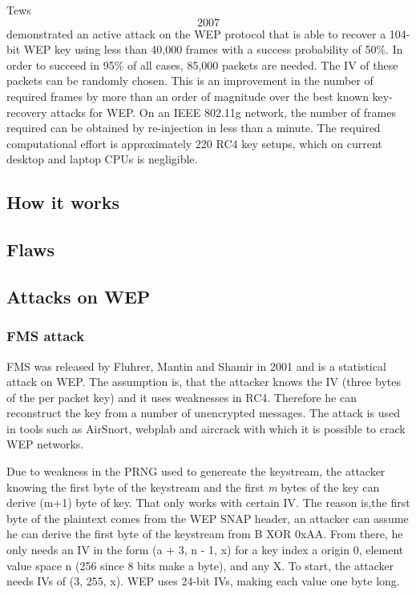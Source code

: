 \documentclass[a4paper,12pt,pagesize,headsepline,bibtotoc,titlepage]{scrartcl}
\begin{document}
Tews\[2007\] demonstrated an active attack on the WEP protocol that is able to recover a 104-bit WEP key using less than 40,000 frames with a success probability of 50\%. In order to succeed in 95\% of all cases, 85,000 packets are needed. The IV of these packets can be randomly chosen. This is an improvement in the number of required frames by more than an  order of magnitude over the best known key-recovery attacks for WEP.
On an IEEE 802.11g network, the number of frames required can be obtained by re-injection in less than a minute. The required computational effort is approximately 220 RC4 key setups, which on current desktop and laptop CPUs is negligible. 



\subsection{How it works}
\subsection{Flaws}
\subsection{Attacks on WEP}


\subsubsection{FMS attack}
FMS was released by Fluhrer, Mantin and Shamir in 2001 \cite{fms} and is a statistical attack on WEP.
The assumption is, that the attacker knows the IV (three bytes of the per packet key) and it uses weaknesses in RC4. Therefore he can reconstruct the key from a number of unencrypted messages.
The attack is used in tools such as AirSnort, webplab and aircrack with which it is possible to crack WEP networks.

Due to weakness in the PRNG used to genereate the keystream, the attacker knowing the first byte of the keystream and the first \emph{m} bytes of the key can derive (m+1) byte of key. That only works with certain IV.
The reason is,the first byte of the plaintext comes from the WEP SNAP header, an attacker can assume he can derive the first byte of the keystream from B XOR 0xAA. From there, he only needs an IV in the form (a + 3, n - 1, x) for a key index a origin 0, element value space n (256 since 8 bits make a byte), and any X. To start, the attacker needs IVs of (3, 255, x). WEP uses 24-bit IVs, making each value one byte long.\cite{wikipedia-fms}
\end{document}

